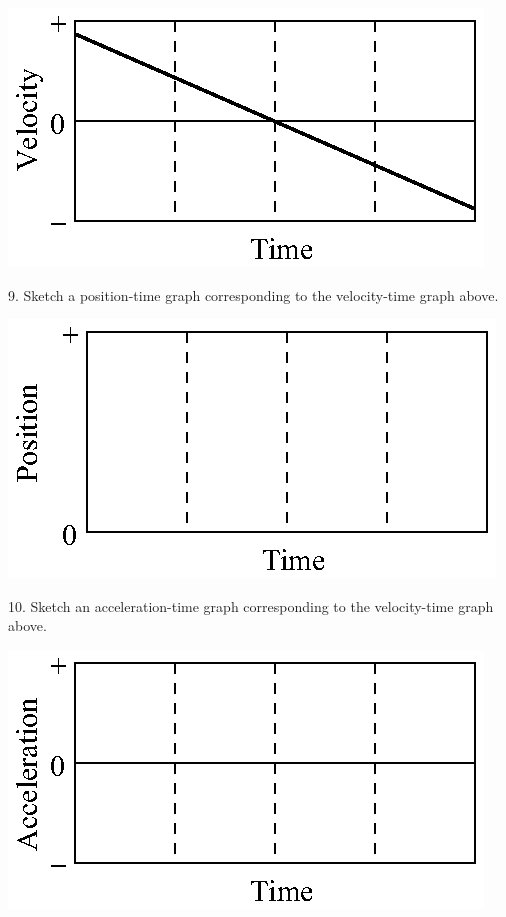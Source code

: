 \vspace{0.3cm}
{\par\raggedright \includegraphics{slowing/slowing_fig12.eps} \par}
\vspace{0.3cm}

9. Sketch a position-time graph corresponding to the velocity-time graph above.

\vspace{0.3cm}
{\par\centering \includegraphics{slowing/slowing_fig13.eps} \par}
\vspace{0.3cm}

10. Sketch an acceleration-time graph corresponding to the velocity-time graph
above.

\vspace{0.3cm}
{\par\centering \includegraphics{slowing/slowing_fig14.eps} \par}
\vspace{0.3cm}

